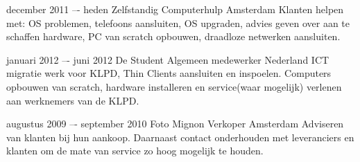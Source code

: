 \begin{cventries}
  \cventry
    {december 2011 –- heden}
    {Zelfstandig}
    {Computerhulp}
    {Amsterdam}
    {Klanten helpen met: OS problemen, telefoons aansluiten, OS upgraden, advies geven over aan te schaffen hardware, PC van scratch opbouwen, draadloze netwerken aansluiten.}

  \cventry
    {januari 2012 –- juni 2012}
    {De Student}
    {Algemeen medewerker}
    {Nederland}
    {ICT migratie werk voor KLPD, Thin Clients aansluiten en inspoelen. Computers opbouwen van scratch, hardware installeren en service(waar mogelijk) verlenen aan werknemers van de KLPD.}

  \cventry
    {augustus 2009 –- september 2010}
    {Foto Mignon}
    {Verkoper}
    {Amsterdam}
    {Adviseren van klanten bij hun aankoop. Daarnaast contact onderhouden met leveranciers en klanten om de mate van service zo hoog mogelijk te houden.}
\fi
\end{cventries}